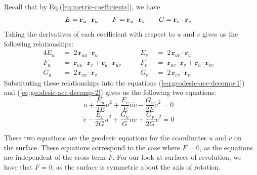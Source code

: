 \documentclass[12pt]{article}
\begin{document}
Recall that by Eq.(\ref{eq:metric-coefficients}), we have
\[
	E = \mathbf{r}_{u} \cdot \mathbf{r}_{u}  \qquad F = \mathbf{r}_{u} \cdot \mathbf{r}_{v} \qquad G = \mathbf{r}_{v} \cdot \mathbf{r}_{v}\\
\]
Taking the derivatives of each coefficient with respect to $u$ and $v$ gives us the following relationships:
\begin{alignat*}{4}
E_{u} \; &=\; 2\,\mathbf{r}_{uu}\cdot \mathbf{r}_{u} \quad &\quad E_{v} \; &=\; 2\,\mathbf{r}_{uv}\cdot \mathbf{r}_{u}\\[5pt]
F_{u} \; &=\; \mathbf{r}_{uu}\cdot \mathbf{r}_{v} + \mathbf{r}_{u}\cdot \mathbf{r}_{uv} \quad &\quad F_{v} \; &=\; \mathbf{r}_{uv}\cdot \mathbf{r}_{v} + \mathbf{r}_{u}\cdot \mathbf{r}_{vv}\\[5pt]
G_{u} \; &=\; 2\,\mathbf{r}_{vu}\cdot \mathbf{r}_{v} \quad &\quad G_{v} \; &=\; 2\,\mathbf{r}_{vv}\cdot \mathbf{r}_{v}
\end{alignat*}
Substituting these relationships into the equations (\ref{eq:geodesic-acc-decomp-1}) and (\ref{eq:geodesic-acc-decomp-2}) gives us the following two equations:
\begin{equation}\label{eq:geodesic-uv}
	\ddot{u} + \frac{E_{u}}{2E}\dot{u}^{2} + \frac{E_{v}}{E}\dot{u}\dot{v} - \frac{G_{u}}{2E}\dot{v}^{2} = 0
\end{equation}
\begin{equation}\label{eq:geodesic-vu}
	\ddot{v} - \frac{E_{v}}{2G}\dot{u}^{2} + \frac{G_{u}}{G}\dot{u}\dot{v} + \frac{G_{v}}{2G}\dot{v}^{2} = 0
\end{equation}

These two equations are the geodesic equations for the coordinates \(u\) and \(v\) on the surface.
These equations correspond to the case where $F = 0$, as the equations are independent of the cross term $F$.
For our look at surfaces of revolution, we have that $F = 0$, as the surface is symmetric about the axis of rotation.
\end{document}
